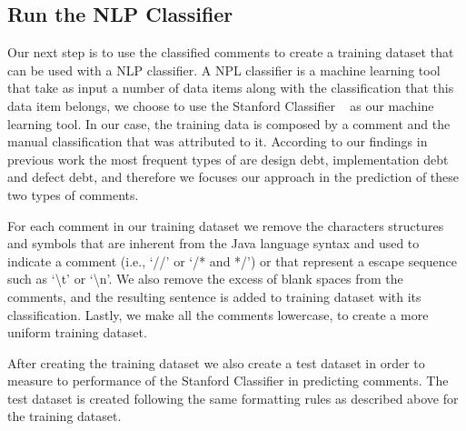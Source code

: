 

\subsection{Run the NLP Classifier} %
\label{sub:run_the_nlp_classifier}
 
Our next step is to use the classified \SATD comments to create a training dataset that can be used with a NLP classifier. A NPL classifier is a machine learning tool that take as input a number of data items along with the classification that this data item belongs, we choose to use the Stanford Classifier ~\cite{Manning2014ACL} as our machine learning tool. In our case, the training data is composed by a comment and the manual classification that was attributed to it. According to our findings in previous work \cite{Maldonado2015MTD} the most frequent types of \SATD are design debt, implementation debt and defect debt, and therefore we focuses our approach in the prediction of these two types of \SATD comments.

For each comment in our training dataset we remove the characters structures and symbols that are inherent from the Java language syntax and used to indicate a comment (i.e., `//' or `/* and */') or that represent a escape sequence such as `\textbackslash t' or `\textbackslash n'. We also remove the excess of blank spaces from the comments, and the resulting sentence is added to training dataset with its classification. Lastly, we make all the comments lowercase, to create a more uniform training dataset.  

After creating the training dataset we also create a test dataset in order to measure to performance of the Stanford Classifier in predicting \SATD comments. The test dataset is created following the same formatting rules as described above for the training dataset. 

